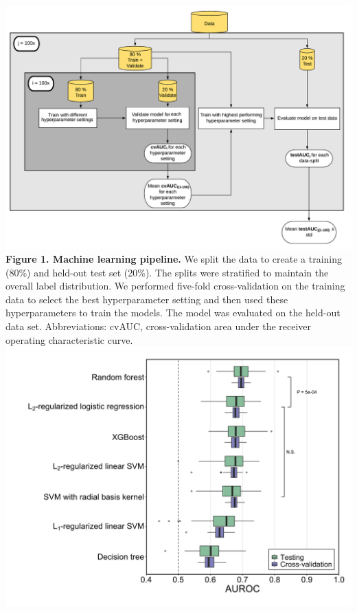 \documentclass[11pt,]{article}
\begin{document}
\includegraphics{Figure_1.pdf} \textbf{Figure 1. Machine learning
pipeline.} We split the data to create a training (80\%) and held-out
test set (20\%). The splits were stratified to maintain the overall
label distribution. We performed five-fold cross-validation on the
training data to select the best hyperparameter setting and then used
these hyperparameters to train the models. The model was evaluated on
the held-out data set. Abbreviations: cvAUC, cross-validation area under
the receiver operating characteristic curve. \newpage
\includegraphics{Figure_2.png}
\end{document}
